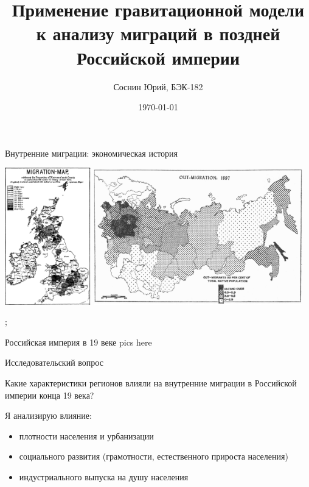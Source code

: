 \documentclass[aspectratio=169]{beamer}
\title[Your Short Title]{Применение гравитационной модели к анализу миграций в поздней Российской империи}
\author{Соснин Юрий, БЭК-182}
\institute{HSE}
\date{\today}
\begin{document}
\begin{frame}
  \titlepage
\end{frame}


\begin{frame}{Внутренние миграции: экономическая история}
	
\includegraphics[width=0.28\textwidth]{britain.png}
\includegraphics[width=0.68\textwidth]{russia.png}

\cite{ravenstein_laws_1885}; \cite{leasure_internal_1968}

\end{frame}

\begin{frame}{Российская империя в 19 веке}
pics here
\end{frame}

\begin{frame}{Исследовательский вопрос}

Какие характеристики регионов влияли на внутренние миграции в Российской империи конца 19 века?
\par
Я анализирую влияние:
\begin{itemize}
	\item плотности населения и урбанизации
	\item социального развития (грамотности, естественного прироста населения)
	\item индустриального выпуска на душу населения
\end{itemize}

\end{frame}
\end{document}
